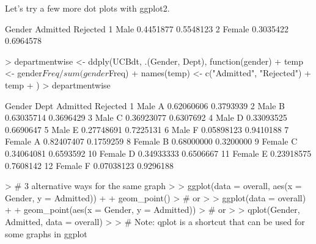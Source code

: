 \documentclass[12pt,letterpaper,final]{article}
\begin{document}
Let's try a few more dot plots with ggplot2. 

\begin{Schunk}
\begin{Soutput}
  Gender  Admitted  Rejected
1   Male 0.4451877 0.5548123
2 Female 0.3035422 0.6964578
\end{Soutput}
\begin{Sinput}
> departmentwise <- ddply(UCBdt, .(Gender, Dept), function(gender) {
+   temp <- gender$Freq / sum(gender$Freq)
+   names(temp) <- c("Admitted", "Rejected")
+   temp
+ })
> departmentwise
\end{Sinput}
\begin{Soutput}
   Gender Dept   Admitted  Rejected
1    Male    A 0.62060606 0.3793939
2    Male    B 0.63035714 0.3696429
3    Male    C 0.36923077 0.6307692
4    Male    D 0.33093525 0.6690647
5    Male    E 0.27748691 0.7225131
6    Male    F 0.05898123 0.9410188
7  Female    A 0.82407407 0.1759259
8  Female    B 0.68000000 0.3200000
9  Female    C 0.34064081 0.6593592
10 Female    D 0.34933333 0.6506667
11 Female    E 0.23918575 0.7608142
12 Female    F 0.07038123 0.9296188
\end{Soutput}
\begin{Sinput}
> # 3 alternative ways for the same graph
> 
> ggplot(data = overall, aes(x = Gender, y = Admitted)) +
+   geom_point()
> # or
> 
> ggplot(data = overall) +
+   geom_point(aes(x = Gender, y = Admitted))
> # or
> 
> qplot(Gender, Admitted, data = overall)
> 
> # Note: qplot is a shortcut that can be used for some graphs in ggplot
\end{Sinput}
\end{Schunk}
\end{document}
